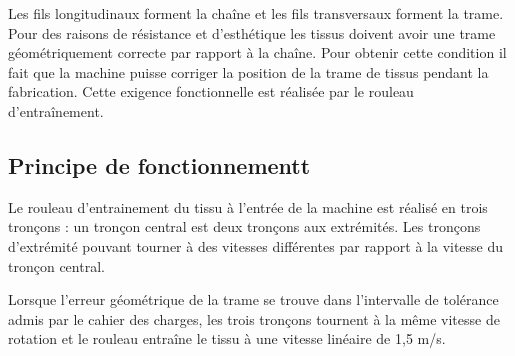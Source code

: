 \documentclass[10pt]{article}
\begin{document}
Les fils longitudinaux forment la chaîne et les fils transversaux forment la trame. Pour des raisons de résistance et d’esthétique les tissus doivent avoir une trame géométriquement correcte par rapport à la chaîne. Pour obtenir cette condition il fait que la machine puisse corriger la position de la trame de tissus pendant la fabrication. Cette exigence fonctionnelle est réalisée par le rouleau d’entraînement.
\subsection*{Principe de fonctionnementt}

Le rouleau d’entrainement du tissu à l’entrée de la machine est réalisé en trois tronçons : un tronçon central est deux tronçons aux extrémités. Les tronçons d’extrémité pouvant tourner à des vitesses différentes par rapport à la vitesse du tronçon central. %
 	 

Lorsque l’erreur géométrique de la trame se trouve dans l’intervalle de tolérance admis par le cahier des charges, les trois tronçons tournent à la même vitesse de rotation et le rouleau entraîne le tissu à une vitesse linéaire de 1,5 m/s. 
 	 
\end{document}
